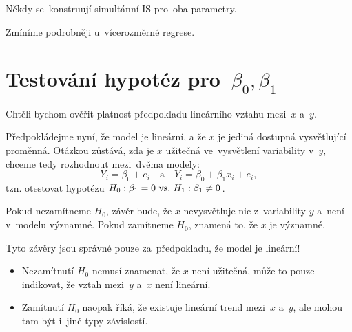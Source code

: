 \begin{remark}
	Někdy se~konstruují simultánní IS pro~oba parametry.

\begin{center}

\end{center}	
	
	 Zmíníme podrobněji u~vícerozměrné regrese.
\end{remark}


\section{Testování hypotéz pro~$\beta_0, \beta_1$ }

Chtěli bychom ověřit platnost předpokladu lineárního vztahu mezi~$x$ a~$y$.

Předpokládejme nyní, že model je lineární, a že $x$ je jediná dostupná vysvětlující proměnná. Otázkou zůstává, zda je $x$ užitečná ve~vysvětlení variability v~$y$, chceme tedy rozhodnout mezi~dvěma modely:
 $$
	Y_i = \beta_0 + e_i \quad \text{a} \quad Y_i = \beta_0 + \beta_1 x_i + e_i,
 $$
tzn. otestovat hypotézu $H_0: \beta_1 = 0 ~\text{vs.}~ H_1: \beta_1 \neq 0$.

Pokud nezamítneme $H_0$, závěr bude, že $x$ nevysvětluje nic z~variability $y$ a~není v~modelu významné. Pokud zamítneme $H_0$, znamená to, že $x$ je významné.

\begin{remark}
	Tyto závěry jsou správné pouze za~předpokladu, že model je lineární!
	\begin{itemize}
		\item Nezamítnutí $H_0$ nemusí znamenat, že $x$ není užitečná, může to pouze indikovat, že vztah mezi~$y$ a~$x$ není lineární.
		\item Zamítnutí $H_0$ naopak říká, že existuje lineární trend mezi~$x$ a~$y$, ale mohou tam být i~jiné typy závislostí.
	\end{itemize}
\end{remark}

